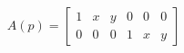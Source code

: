 \begin{equation*}
    \label{eq:affine-model-parameter-matrix}
    A(p) = \begin{bmatrix}
        1 & x & y & 0 & 0 & 0 \\
        0 & 0 & 0 & 1 & x & y
    \end{bmatrix}
\end{equation*}